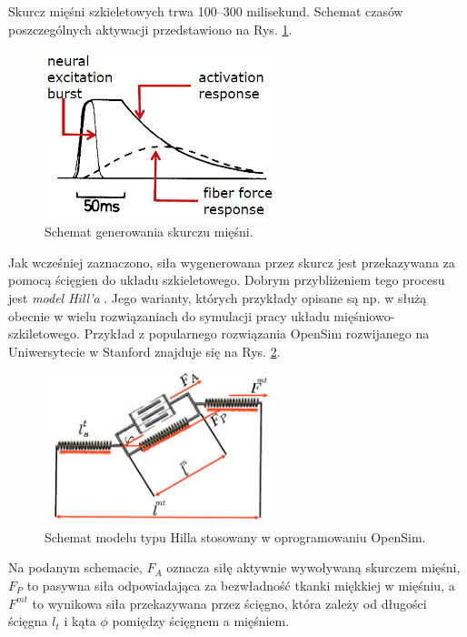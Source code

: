 Skurcz mięśni szkieletowych trwa 100--300 milisekund. Schemat czasów poszczególnych aktywacji przedstawiono na Rys. \ref{muscle-excitements}. 
\begin{figure}[h!]
	\centering
	\includegraphics[width=0.6\textwidth]{figures/skurcz_miesni.png}
	\caption{Schemat generowania skurczu mięśni.}
	\label{muscle-excitements}
\end{figure}
Jak wcześniej zaznaczono, siła wygenerowana przez skurcz jest przekazywana za pomocą ścięgien do układu szkieletowego. Dobrym przybliżeniem tego procesu jest \textit{model Hill'a} \cite{Hill1938}. Jego warianty, których przykłady opisane są np. w \cite{Perreault2003} służą obecnie w wielu rozwiązaniach do symulacji pracy układu mięśniowo-szkiletowego. Przykład z popularnego rozwiązania OpenSim rozwijanego na Uniwersytecie w Stanford znajduje się na Rys. \ref{hill-model}.
\begin{figure}[h!]
	\centering
	\includegraphics[width=0.6\textwidth]{figures/Hill.png}
	\caption{Schemat modelu typu Hilla stosowany w oprogramowaniu OpenSim.}
	\label{hill-model}
\end{figure}

Na podanym schemacie, $F_A$ oznacza siłę aktywnie wywoływaną skurczem mięśni, $F_P$ to pasywna siła odpowiadająca za bezwładność tkanki miękkiej w mięśniu, a $F^{mt}$ to wynikowa siła przekazywana przez ścięgno, która zależy od długości ścięgna $l_t$ i kąta $\phi$ pomiędzy ścięgnem a mięśniem. 

